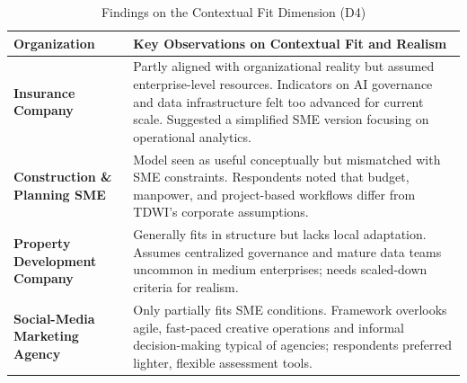\documentclass[conference]{IEEEtran}
\begin{document}
\begin{table}[t]
\centering
\caption{Findings on the Contextual Fit Dimension (D4)}
\label{tab:d4_contextualfit}
\renewcommand{\arraystretch}{1.2}
\begin{tabular}{p{.16\linewidth} p{.74\linewidth}}
\hline
\textbf{Organization} & \textbf{Key Observations on Contextual Fit and Realism} \\ \hline

\textbf{Insurance Company} & 
Partly aligned with organizational reality but assumed enterprise-level resources.  
Indicators on AI governance and data infrastructure felt too advanced for current scale.  
Suggested a simplified SME version focusing on operational analytics. \\ \hline

\textbf{Construction \& Planning SME} & 
Model seen as useful conceptually but mismatched with SME constraints.  
Respondents noted that budget, manpower, and project-based workflows differ from TDWI’s corporate assumptions. \\ \hline

\textbf{Property Development Company} & 
Generally fits in structure but lacks local adaptation.  
Assumes centralized governance and mature data teams uncommon in medium enterprises; needs scaled-down criteria for realism. \\ \hline

\textbf{Social-Media Marketing Agency} & 
Only partially fits SME conditions.  
Framework overlooks agile, fast-paced creative operations and informal decision-making typical of agencies; respondents preferred lighter, flexible assessment tools. \\ \hline
\end{tabular}
\end{table}
\end{document}
